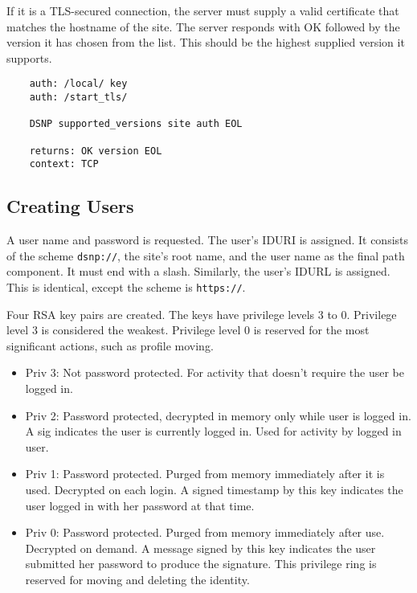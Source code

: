 \documentclass[letterpaper,11pt,oneside]{article}
\begin{document}
If it is a TLS-secured connection, the server must supply a valid certificate
that matches the hostname of the site. The server responds with OK followed by
the version it has chosen from the list. This should be the highest supplied
version it supports.

\vspace{10pt}
\begin{verbatim}
    auth: /local/ key
    auth: /start_tls/

    DSNP supported_versions site auth EOL

    returns: OK version EOL
    context: TCP
\end{verbatim}

\subsection{Creating Users}

A user name and password is requested. The user's IDURI is assigned. It
consists of the scheme \verb'dsnp://', the site's root name, and the user name
as the final path component. It must end with a slash. Similarly, the user's
IDURL is assigned. This is identical, except the scheme is \verb'https://'.

%
%

Four RSA key pairs are created. The keys have privilege levels 3 to 0.
Privilege level 3 is considered the weakest. Privilege level 0 is reserved for
the most significant actions, such as profile moving.

\begin{itemize}
\item Priv 3: Not password protected. For activity that doesn't require the user be logged
in.

\item Priv 2: Password protected, decrypted in memory only while user is logged
in. A sig indicates the user is currently logged in. Used for activity by
logged in user.

\item Priv 1: Password protected. Purged from memory immediately after it is
used. Decrypted on each login. A signed timestamp by this key indicates the
user logged in with her password at that time.

\item Priv 0: Password protected. Purged from memory immediately after use.
Decrypted on demand. A message signed by this key indicates the user submitted
her password to produce the signature. This privilege ring is reserved for
moving and deleting the identity.
\end{itemize}
\end{document}
